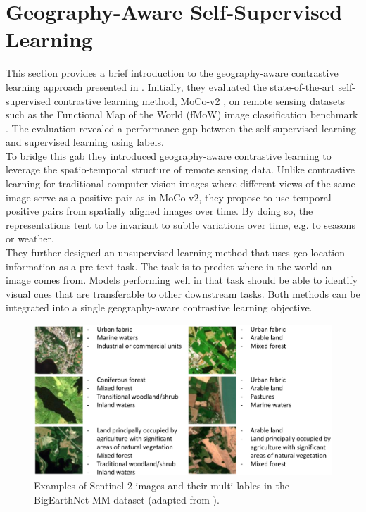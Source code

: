 \section{Geography-Aware Self-Supervised Learning}
\label{sec:methodology}

This section provides a brief introduction to the geography-aware contrastive learning approach presented in \cite{geoAwareSelfSuper}. Initially, they evaluated the state-of-the-art self-supervised contrastive learning method, MoCo-v2 \cite{mocoV2}, on remote sensing datasets such as the Functional Map of the World (fMoW) image classification benchmark \cite{fmow}. The evaluation revealed a performance gap between the self-supervised learning and supervised learning using labels. \\
To bridge this gab they introduced geography-aware contrastive learning to leverage the spatio-temporal structure of remote sensing data. Unlike contrastive learning for traditional computer vision images where different views of the same image serve as a positive pair as in MoCo-v2, they propose to use temporal positive pairs from spatially aligned images over time. By doing so, the representations tent to be invariant to subtle variations over time, e.g. to seasons or weather. \\
They further designed an unsupervised learning method that uses geo-location information as a pre-text task. The task is to predict where in the world an image comes from. Models performing well in that task should be able to identify visual cues that are transferable to other downstream tasks. Both methods can be integrated into a single geography-aware contrastive learning objective. \\


\begin{figure}[t]
  \centering
   \includegraphics[width=\linewidth]{figures/BigEarthNet.png}
   \caption{Examples of Sentinel-2 images and their multi-lables in the BigEarthNet-MM dataset (adapted from \cite{BigEarthNetImg}).}
   \label{fig:BigEarth}
\end{figure}

